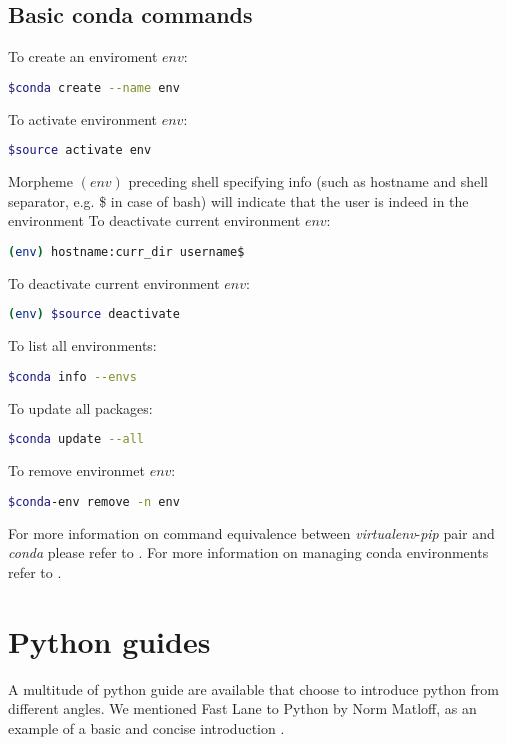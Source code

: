 \documentclass[article]{revtex4}
\begin{document}
\subsection{Basic conda commands}

\noindent To create an enviroment $env$:
\begin{lstlisting}[language=bash]
$conda create --name env
\end{lstlisting}

\noindent To activate environment $env$:
\begin{lstlisting}[language=bash]
$source activate env
\end{lstlisting}

Morpheme $(env)$ preceding shell specifying info  (such as hostname and shell separator, e.g. \$ in case of bash) will indicate that the user is indeed in the environment
\noindent To deactivate current environment $env$:
\begin{lstlisting}[language=bash]
(env) hostname:curr_dir username$
\end{lstlisting}

\noindent To deactivate current environment $env$:
\begin{lstlisting}[language=bash]
(env) $source deactivate
\end{lstlisting}

\noindent To list all environments:
\begin{lstlisting}[language=bash]
$conda info --envs
\end{lstlisting}

\noindent To update all packages:
\begin{lstlisting}[language=bash]
$conda update --all
\end{lstlisting}

\noindent To remove environmet $env$:
\begin{lstlisting}[language=bash]
$conda-env remove -n env
\end{lstlisting}

For more information on command equivalence between {\it virtualenv}-{\it pip} pair and {\it conda} please refer to \cite{cmp-venv-conda}.
For more information on managing conda environments refer to \cite{conda}.

\section{Python guides}
A multitude of python guide are available that choose to introduce python from different angles. We mentioned Fast Lane to Python by Norm Matloff, as an example of a basic and concise introduction \cite{fastlane}.


\end{document}
